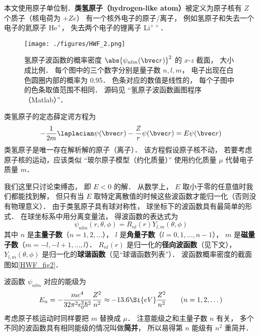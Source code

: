 

本文使用原子单位制．\textbf{类氢原子（hydrogen-like atom）}被定义为原子核有 $Z$ 个质子（核电荷为 $+Ze$） 有一个核外电子的原子/离子， 例如氢原子和失去一个电子的氦原子 $\mathrm{He}^+$， 失去两个电子的锂离子 $\mathrm{Li}^{++}$． %

\begin{figure}[ht]
\centering
\texttt{[image: ./figures/HWF\_2.png]}
\caption{氢原子波函数的概率密度 $\abs{\psi_{nlm}(\bvec r)}^2$ 的 $x$-$z$ 截面， 大小成比例． 每个图中的三个数字分别是量子数 $n, l, m$， 电子出现在白色圆圈内部的概率为 0.95． 色条对应的数值是线性的， 每个子图中的色条取值范围不相同． 源码见 “氢原子波函数画图程序（Matlab）”．} \label{HWF_fig2}
\end{figure}

类氢原子的定态薛定谔方程为
\begin{equation}\label{HWF_eq1}
-\frac{1}{2m} \laplacian \psi(\bvec r) - \frac{Z}{r} \psi(\bvec r) = E \psi(\bvec r)
\end{equation}
类氢原子是唯一存在解析解的原子（离子）． 该方程假设原子核不动， 若要考虑原子核的运动，应该类似 “玻尔原子模型（约化质量）” 使用约化质量 $\mu$ 代替电子质量 $m$．

我们这里只讨论束缚态， 即 $E < 0$ 的解．  从数学上， $E$ 取小于零的任意值时我们都能找到解， 但只有当 $E$ 取特定离散值的时候这些波函数才能归一化（否则没有物理意义）． 由于类氢原子具有球对称性， 球坐标下的波函数具有最简单的形式． 在球坐标系中用分离变量法， 得波函数的表达式为
\begin{equation}\label{HWF_eq3}
\psi_{nlm} (r,\theta ,\phi) = R_{nl}(r) Y_{l,m}(\theta, \phi)
\end{equation}
其中 $n$ 是\textbf{主量子数}（$n = 1, 2, \dots$）， $l$ 是\textbf{角量子数}（$l = 0, 1, \dots, n - 1$）， $m$ 是\textbf{磁量子数}（$m = -l, -l+1, \dots, l$）． $R_{nl}(r)$ 是归一化的\textbf{径向波函数}（见下文）， $Y_{l,m}(\theta, \phi)$ 是归一化的\textbf{球谐函数}（见“球谐函数列表”）． 波函数概率密度的截面图如\autoref{HWF_fig2}．

波函数 $\psi_{nlm}$ 对应的能级为
\begin{equation}
E_n =  - \frac{m e^4}{32 \pi^2 \epsilon_0^2 \hbar ^2} \frac{Z^2}{n^2} \approx - 13.6\Si{eV} \frac{Z^2}{n^2}
\qquad (n = 1, 2, \dots)
\end{equation}
考虑原子核运动时同样要把 $m$ 替换成 $\mu$． 注意能级之和主量子数 $n$ 有关， 多个不同的波函数具有相同能级的情况叫做\textbf{简并}， 所以易得第 $n$ 能级有 $n^2$ 重简并．


